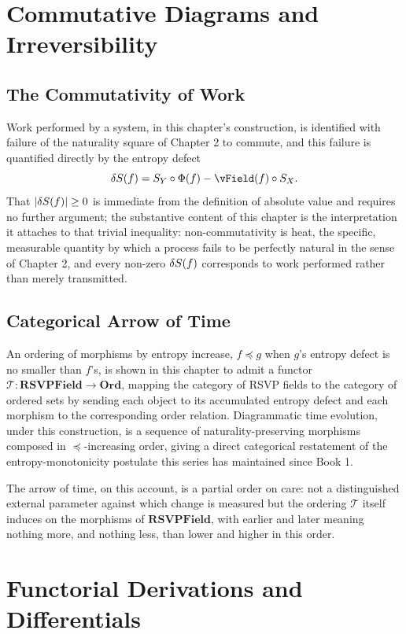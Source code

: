 \part{Commutative Diagrams and Irreversibility}

\chapter{The Commutativity of Work}

Work performed by a system, in this chapter's construction, is identified with failure of the naturality square of Chapter 2 to commute, and this failure is quantified directly by the entropy defect
\[
\delta \SEntropy(f) = \SEntropy_Y \circ \PhiField(f) - \vField(f) \circ \SEntropy_X.
\]
That $|\delta S(f)| \geq 0$ is immediate from the definition of absolute value and requires no further argument; the substantive content of this chapter is the interpretation it attaches to that trivial inequality: non-commutativity is heat, the specific, measurable quantity by which a process fails to be perfectly natural in the sense of Chapter 2, and every non-zero $\delta S(f)$ corresponds to work performed rather than merely transmitted.

\chapter{Categorical Arrow of Time}

An ordering of morphisms by entropy increase, $f \preceq g$ when $g$'s entropy defect is no smaller than $f$'s, is shown in this chapter to admit a functor $\mathcal{T}: \mathbf{RSVPField} \to \mathbf{Ord}$, mapping the category of RSVP fields to the category of ordered sets by sending each object to its accumulated entropy defect and each morphism to the corresponding order relation. Diagrammatic time evolution, under this construction, is a sequence of naturality-preserving morphisms composed in $\preceq$-increasing order, giving a direct categorical restatement of the entropy-monotonicity postulate this series has maintained since Book 1.

The arrow of time, on this account, is a partial order on care: not a distinguished external parameter against which change is measured but the ordering $\mathcal{T}$ itself induces on the morphisms of $\mathbf{RSVPField}$, with earlier and later meaning nothing more, and nothing less, than lower and higher in this order.

\part{Functorial Derivations and Differentials}

